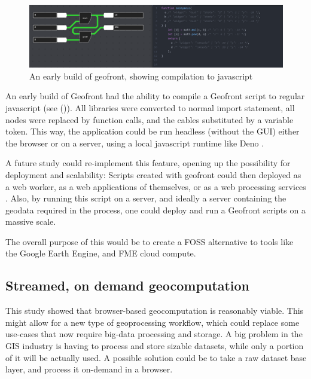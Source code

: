 \begin{figure}
  \centering
  \graphicspath{ {../../assets/images/implementation/} }
  \includegraphics[width=\linewidth]{early-geofront.png}
  \caption[Geofront to js]{An early build of geofront, showing compilation to javascript}
  \label{fig:early-geofront-compile-to-js}
\end{figure}

An early build of Geofront had the ability to compile a Geofront script to regular javascript (see ()).  
All libraries were converted to normal import statement, all nodes were replaced by function calls, and the cables substituted by a variable token. 
This way, the application could be run headless (without the \ac{GUI}) either the browser or on a server, using a local javascript runtime like Deno \citep{contributers_deno_2022}.

A future study could re-implement this feature, opening up the possibility for deployment and scalability: 
Scripts created with geofront could then deployed as a web worker, as a web applications of themselves, or as a web processing services \citep{open_geospatial_consortium_web_2015}.
Also, by running this script on a server, and ideally a server containing the geodata required in the process, one could deploy and run a Geofront scripts on a massive scale. 

The overall purpose of this would be to create a \ac{FOSS} alternative to tools like the Google Earth Engine, and FME cloud compute. 

\subsection{Streamed, on demand geocomputation}

This study showed that browser-based geocomputation is reasonably viable. 
This might allow for a new type of geoprocessing workflow, which could replace some use-cases that now require big-data processing and storage.
A big problem in the \ac{GIS} industry is having to process and store sizable datasets, while only a portion of it will be actually used. 
A possible solution could be to take a raw dataset base layer, and process it on-demand in a browser.

